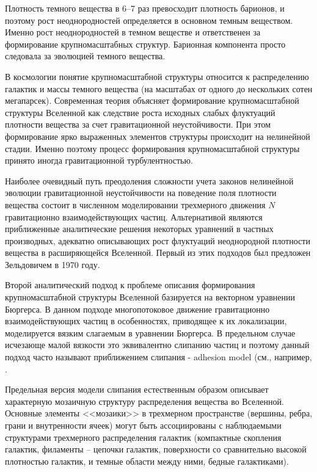 Плотность темного вещества в 6--7 раз превосходит плотность барионов, и поэтому рост неоднородностей определяется в основном темным веществом. Именно рост неоднородностей в темном веществе и ответственен за формирование крупномасштабных структур. Барионная компонента просто следовала за эволюцией темного вещества.

В космологии понятие крупномасштабной структуры относится к распределению галактик и массы темного вещества (на масштабах от одного до нескольких сотен мегапарсек). Современная теория объясняет формирование крупномасштабной структуры Вселенной как следствие роста исходных слабых флуктуаций плотности вещества за счет гравитационной неустойчивости. При этом формирование ярко выраженных элементов структуры происходит на нелинейной стадии. Именно поэтому процесс формирования крупномасштабной структуры принято иногда гравитационной турбулентностью.

Наиболее очевидный путь преодоления сложности учета законов нелинейной эволюции гравитационной неустойчивости на поведение поля плотности вещества состоит в численном моделировании трехмерного движения $N$ гравитационно взаимодействующих частиц. Альтернативой являются приближенные аналитические решения некоторых уравнений в частных производных, адекватно описывающих рост флуктуаций неоднородной плотности вещества в расширяющейся Вселенной. Первый из этих подходов был предложен Зельдовичем в 1970 году.

Второй аналитический подход к проблеме описания формирования крупномасштабной структуры Вселенной \cite{a1} базируется на векторном уравнении Бюргерса. В данном подходе многопотоковое движение гравитационно взаимодействующих частиц в особенностях, приводящее к их локализации, моделируется вязким слагаемым в уравнении Бюргерса. В предельном случае исчезающе малой вязкости это эквивалентно слипанию частиц и поэтому данный подход часто называют приближением слипания - adhesion model (см., например, \cite{a2,a3,a4,a5}. 

Предельная версия модели слипания естественным образом описывает характерную мозаичную структуру распределения вещества во Вселенной. Основные элементы <<мозаики>> в трехмерном пространстве (вершины, ребра, грани и внутренности ячеек) могут быть ассоциированы с наблюдаемыми структурами трехмерного распределения галактик (компактные скопления галактик, филаменты -- цепочки галактик, поверхности со сравнительно высокой плотностью галактик, и темные области между ними, бедные галактиками).

